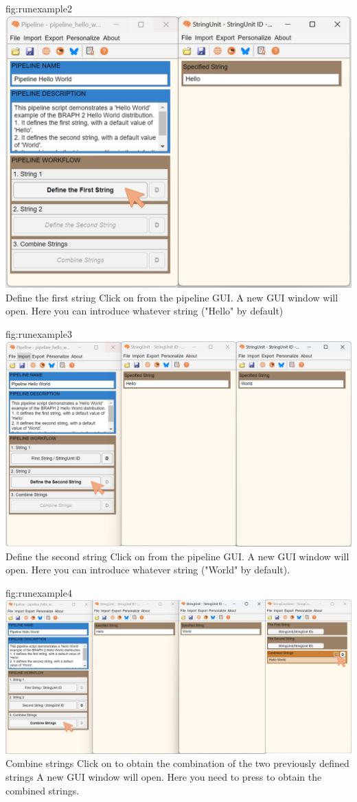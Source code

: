 \documentclass{tufte-handout}
\begin{document}

{fig:runexample2}
{\includegraphics{fig05.jpg}}
{Define the first string}
{
	Click on  from the pipeline GUI. A new GUI window will open. Here you can introduce whatever string ("Hello" by default)
}


{fig:runexample3}
{\includegraphics{fig06.jpg}}
{Define the second string}
{
	Click on  from the pipeline GUI. A new GUI window will open. Here you can introduce whatever string ("World" by default).
}


{fig:runexample4}
{\includegraphics{fig07.jpg}}
{Combine strings}
{
	Click on  to obtain the combination of the two previously defined strings A new GUI window will open. Here you need to press   to obtain the combined strings.
}
\end{document}
